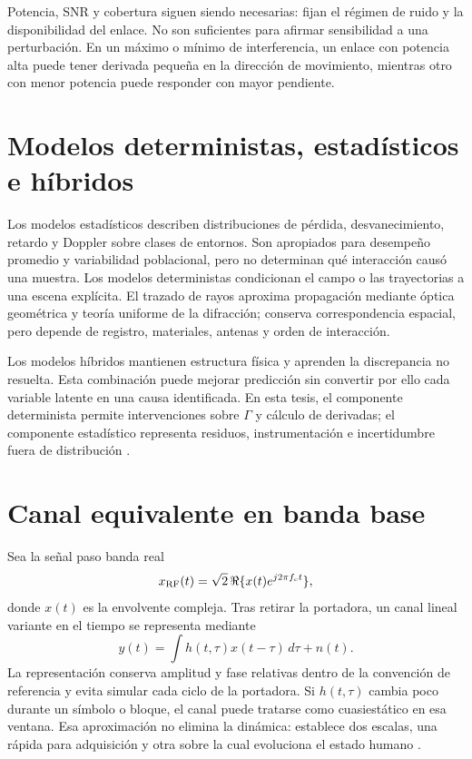 Potencia, \ac{SNR} y cobertura siguen siendo necesarias: fijan el régimen de ruido
y la disponibilidad del enlace. No son suficientes para afirmar sensibilidad a
una perturbación. En un máximo o mínimo de interferencia, un enlace con potencia
alta puede tener derivada pequeña en la dirección de movimiento, mientras otro
con menor potencia puede responder con mayor pendiente.

\section{Modelos deterministas, estadísticos e híbridos}

Los modelos estadísticos describen distribuciones de pérdida, desvanecimiento,
retardo y Doppler sobre clases de entornos. Son apropiados para desempeño promedio
y variabilidad poblacional, pero no determinan qué interacción causó una muestra.
Los modelos deterministas condicionan el campo o las trayectorias a una escena
explícita. El trazado de rayos aproxima propagación mediante óptica geométrica y
teoría uniforme de la difracción; conserva correspondencia espacial, pero depende
de registro, materiales, antenas y orden de interacción.

Los modelos híbridos mantienen estructura física y aprenden la discrepancia no
resuelta. Esta combinación puede mejorar predicción sin convertir por ello cada
variable latente en una causa identificada. En esta tesis, el componente
determinista permite intervenciones sobre $\Gamma$ y cálculo de derivadas; el
componente estadístico representa residuos, instrumentación e incertidumbre fuera
de distribución \citep{SalehValenzuela1987,Molisch2022}.

\section{Canal equivalente en banda base}

Sea la señal paso banda real
\begin{equation}
x_{\rm RF}(t)=\sqrt{2}\,\Re\{x(t)e^{j2\pi f_ct}\},
\label{eq:complex_envelope}
\end{equation}
donde $x(t)$ es la envolvente compleja. Tras retirar la portadora, un canal lineal
variante en el tiempo se representa mediante
\begin{equation}
y(t)=\int h(t,\tau)x(t-\tau)\,d\tau+n(t).
\label{eq:ltv_channel}
\end{equation}
La representación conserva amplitud y fase relativas dentro de la convención de
referencia y evita simular cada ciclo de la portadora. Si $h(t,\tau)$ cambia poco
durante un símbolo o bloque, el canal puede tratarse como cuasiestático en esa
ventana. Esa aproximación no elimina la dinámica: establece dos escalas, una
rápida para adquisición y otra sobre la cual evoluciona el estado humano
\citep{Bello1963,Molisch2022}.


